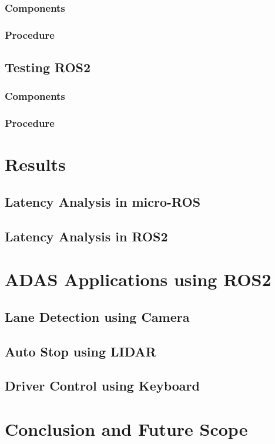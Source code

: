 \documentclass[%
xelatex,
	oneside,		%
	12pt,			%
	parskip=half,	%
	headsepline,	%
	footsepline,	%
	abstracton,
	chapterprefix=true%
    appendixprefix=true]
{scrreprt}
\begin{document}
	\subsection{Components}
	\subsection{Procedure}	

	\section{Testing ROS2}
	\subsection{Components}
	\subsection{Procedure}	


		\chapter{Results}
		\section{Latency Analysis in micro-ROS}
		\section{Latency Analysis in ROS2}
		
		\chapter{ADAS Applications using ROS2}
		\section{Lane Detection using Camera}
		\section{Auto Stop using LIDAR}
		\section{Driver Control using Keyboard}
		
		
		\chapter{Conclusion and Future Scope}
	\listoffigures
	\listoftables
		
		

\end{document}
